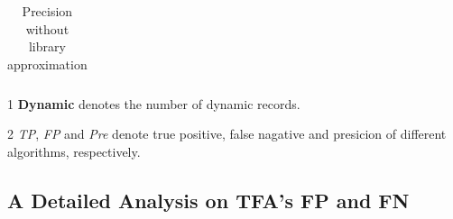 \documentclass{fac}
\newcommand\eg{\textit{e.g.\ }}
\begin{document}
\begin{table}
\begin{threeparttable}[b]
\begin{tabular*}{0.99\textwidth}{|l|c|c|c|c|c|c|c|c|c|c|c|c|c|c|c|}
	\hline
\end{tabular*}
\begin{tablenotes}
  \item[1] \textbf{Dynamic} denotes the number of dynamic records.
  \item[2] \textit{TP}, \textit{FP} and \textit{Pre} denote true positive, false nagative and presicion of different algorithms, respectively.
\end{tablenotes}
\caption{Precision without library approximation}\label{table:nolib-precision}
\end{threeparttable}
\end{table}



\subsection{A Detailed Analysis on TFA's FP and FN}\label{subsec:analysis}


\end{document}

